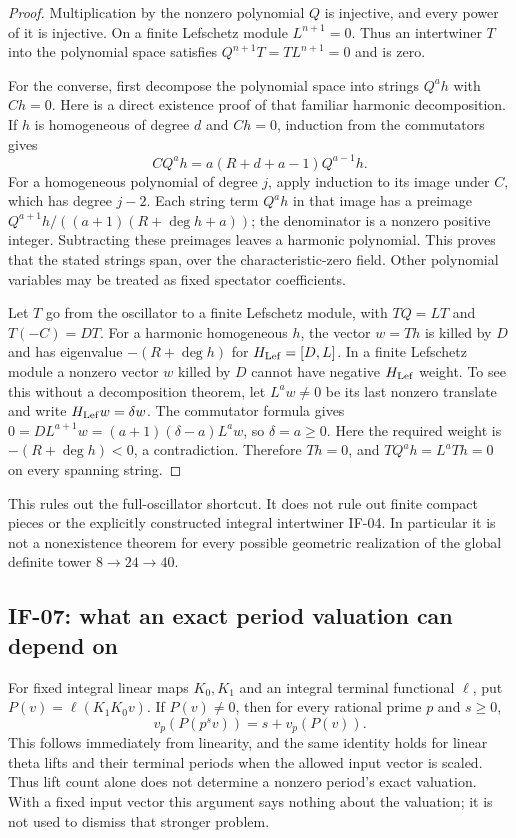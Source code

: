 \documentclass[11pt,a4paper]{article}
\theoremstyle{definition}
\theoremstyle{remark}
\begin{document}
\begin{proof}
Multiplication by the nonzero polynomial $Q$ is injective, and every
power of it is injective. On a finite Lefschetz module $L^{n+1}=0$.
Thus an intertwiner $T$ into the polynomial space satisfies
$Q^{n+1}T=TL^{n+1}=0$ and is zero.

For the converse, first decompose the polynomial space into strings
$Q^a h$ with $Ch=0$. Here is a direct existence proof of that familiar
harmonic decomposition. If $h$ is homogeneous of degree $d$ and
$Ch=0$, induction from the commutators gives
\[
 C Q^a h=a(R+d+a-1)Q^{a-1}h.                       \tag{IF-06a}
\]
For a homogeneous polynomial of degree $j$, apply induction to its
image under $C$, which has degree $j-2$. Each string term $Q^a h$
in that image has a preimage
$Q^{a+1}h/((a+1)(R+\deg h+a))$; the denominator is a nonzero positive
integer. Subtracting these preimages leaves a harmonic polynomial.
This proves that the stated strings span, over the characteristic-zero
field. Other polynomial variables may be treated as fixed spectator
coefficients.

Let $T$ go from the oscillator to a finite Lefschetz module, with
$TQ=LT$ and $T(-C)=DT$. For a harmonic homogeneous $h$, the vector
$w=Th$ is killed by $D$ and has eigenvalue $-(R+\deg h)$ for
$H_{\rm Lef}=[D,L]$. In a finite Lefschetz module a nonzero vector
$w$ killed by $D$ cannot have negative $H_{\rm Lef}$ weight. To see
this without a decomposition theorem, let $L^a w\ne0$ be its last
nonzero translate and write $H_{\rm Lef}w=\delta w$. The commutator
formula gives
$0=DL^{a+1}w=(a+1)(\delta-a)L^a w$, so $\delta=a\geq0$.
Here the required weight is $-(R+\deg h)<0$, a contradiction.
Therefore $Th=0$, and $TQ^a h=L^aTh=0$ on every spanning string.
\end{proof}

This rules out the full-oscillator shortcut. It does not rule out
finite compact pieces or the explicitly constructed integral
intertwiner IF-04. In particular it is not a nonexistence theorem for
every possible geometric realization of the global definite tower
$8\to24\to40$.

\subsection{IF-07: what an exact period valuation can depend on}
For fixed integral linear maps $K_0,K_1$ and an integral terminal
functional $\ell$, put $P(v)=\ell(K_1K_0v)$. If $P(v)\ne0$, then
for every rational prime $p$ and $s\geq0$,
\[
 v_p(P(p^s v))=s+v_p(P(v)).
\]
This follows immediately from linearity, and the same identity holds
for linear theta lifts and their terminal periods when the allowed
input vector is scaled. Thus lift count alone does not determine a
nonzero period's exact valuation. With a fixed input vector this
argument says nothing about the valuation; it is not used to dismiss
that stronger problem.
\end{document}
